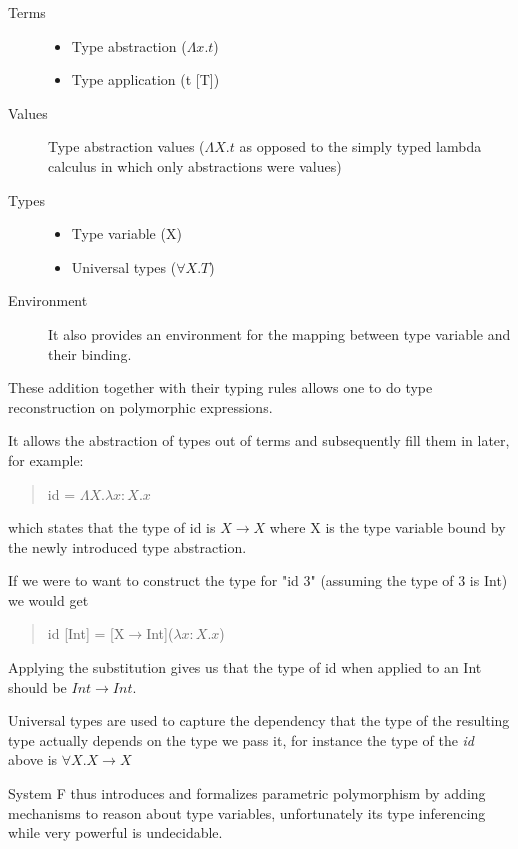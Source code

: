 \documentclass[12pt, a4paper, oneside]{article}
\begin{document}
\begin{description}
\item[Terms]{ \begin{itemize}
				 \item Type abstraction ($\Lambda x.t$)
				 \item Type application (t [T])
				 \end{itemize}
}
\item[Values] Type abstraction values ($\Lambda X.t$ as opposed to the simply typed lambda calculus in which only abstractions were values)
\item[Types]{ \begin{itemize}
				 \item Type variable (X)
				 \item Universal types ($\forall X. T$)
				 \end{itemize}
}
\item[Environment] It also provides an environment for the mapping between type variable and their binding.
\end{description}

These addition together with their typing rules allows one to do type reconstruction on polymorphic expressions.

It allows the abstraction of types out of terms and subsequently fill them in later, for example:
\begin{quotation}
id = $\Lambda X.\lambda x:X. x$
\end{quotation}
which states that the type of id is $X \rightarrow X$ where X is the type variable bound by the newly introduced type abstraction. 

If we were to want to construct the type for "id 3" (assuming the type of 3 is Int) we would get

\begin{quotation}
id [Int] = [X$\rightarrow$Int]($\lambda x:X. x$)
\end{quotation}

Applying the substitution gives us that the type of id when applied to an Int should be $Int \rightarrow Int$.

Universal types are used to capture the dependency that the type of the resulting type actually depends on the type we pass it, for instance the type of the \textit{id} above is $\forall X. X\rightarrow X$

System F thus introduces and formalizes parametric polymorphism by adding mechanisms to reason about type variables, unfortunately its type inferencing   while very powerful is undecidable.
\end{document}
